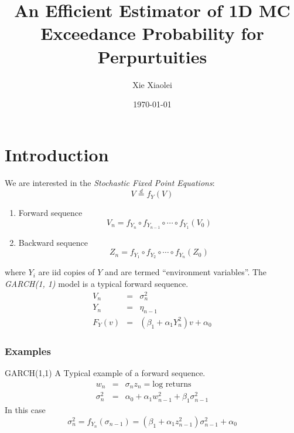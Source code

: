 \documentclass{beamer}
\title{An Efficient Estimator of 1D MC Exceedance Probability for Perpurtuities} %
\author{Xie Xiaolei} %
\institute[UCPH] %
{
Copenhagen University  \\ %
\medskip
\textit{hnq365@math.ku.dk} %
}
\date{\today} %
\begin{document}
\begin{frame}
\titlepage %
\end{frame}


\section{Introduction}
\begin{frame}
  We are interested in the {\it Stochastic Fixed Point Equations}:
  \[
  V \overset{d}{=} f_Y(V)
  \]
  \begin{enumerate}
  \item Forward sequence
    \[
    V_n = f_{Y_n} \circ f_{Y_{n-1}} \circ \cdots \circ f_{Y_1} (V_0)
    \]
    \item Backward sequence
      \[
      Z_n  = f_{Y_1} \circ f_{Y_{2}} \circ \cdots \circ f_{Y_n} (Z_0)
      \]
    \end{enumerate}
    where $Y_i$ are iid copies of $Y$ and are termed ``environment
    variables''. The {\it GARCH(1, 1)} model is a typical forward sequence.
    \begin{eqnarray*}
      V_n &=& \sigma_n^2 \\
      Y_n &=& \eta_{n-1} \\
      F_Y(v) &=& (\beta_1 + \alpha_1 Y_n^2) v + \alpha_0
    \end{eqnarray*}
\end{frame}

\begin{frame}
  \frametitle{Examples}
  \begin{exampleblock}{GARCH(1,1)}
    A Typical example of a forward sequence.
    \begin{eqnarray*}
      w_n &=& \sigma_n z_n = \text{log returns} \\
      \sigma_n^2 &=& \alpha_0 + \alpha_1 w_{n-1}^2 + \beta_1 \sigma_{n-1}^2
    \end{eqnarray*}
    In this case
    \[
    \sigma_n^2 = f_{Y_n} (\sigma_{n-1}) = (\beta_1 + \alpha_1
    z_{n-1}^2) \sigma_{n-1}^2 + \alpha_0
    \]
  \end{exampleblock}
\end{frame}
\end{document}
